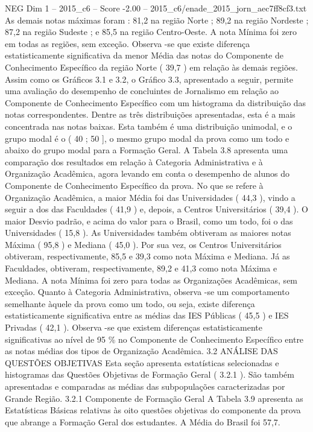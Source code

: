 \begin{textsample}{NEG Dim 1 – 2015\_c6 – Score -2.00 – 2015\_c6/enade\_2015\_jorn\_aec7ff8cf3.txt}
As demais notas máximas foram : 81,2 na região Norte ; 89,2 na região Nordeste ; 87,2 na região Sudeste ; e 85,5 na região Centro-Oeste.
A nota Mínima foi zero em todas as regiões, sem exceção.
Observa -se que existe diferença estatisticamente significativa da menor Média das notas do Componente de Conhecimento Específico da região Norte ( 39,7 ) em relação às demais regiões.
Assim como os Gráficos 3.1 e 3.2, o Gráfico 3.3, apresentado a seguir, permite uma avaliação do desempenho de concluintes de Jornalismo em relação ao Componente de Conhecimento Específico com um histograma da distribuição das notas correspondentes.
Dentre as três distribuições apresentadas, esta é a mais concentrada nas notas baixas.
Esta também é uma distribuição unimodal, e o grupo modal é o ( 40 ; 50 ], o mesmo grupo modal da prova como um todo e abaixo do grupo modal para a Formação Geral.
A Tabela 3.8 apresenta uma comparação dos resultados em relação à Categoria Administrativa e à Organização Acadêmica, agora levando em conta o desempenho de alunos do Componente de Conhecimento Específico da prova.
No que se refere à Organização Acadêmica, a maior Média foi das Universidades ( 44,3 ), vindo a seguir a dos das Faculdades ( 41,9 ) e, depois, a Centros Universitários ( 39,4 ).
O maior Desvio padrão, e acima do valor para o Brasil, como um todo, foi o das Universidades ( 15,8 ).
As Universidades também obtiveram as maiores notas Máxima ( 95,8 ) e Mediana ( 45,0 ).
Por sua vez, os Centros Universitários obtiveram, respectivamente, 85,5 e 39,3 como nota Máxima e Mediana.
Já as Faculdades, obtiveram, respectivamente, 89,2 e 41,3 como nota Máxima e Mediana.
A nota Mínima foi zero para todas as Organizações Acadêmicas, sem exceção.
Quanto à Categoria Administrativa, observa -se um comportamento semelhante àquele da prova como um todo, ou seja, existe diferença estatisticamente significativa entre as médias das IES Públicas ( 45,5 ) e IES Privadas ( 42,1 ).
Observa -se que existem diferenças estatisticamente significativas ao nível de 95 \% no Componente de Conhecimento Específico entre as notas médias dos tipos de Organização Acadêmica. 3.2 ANÁLISE DAS QUESTÕES OBJETIVAS Esta seção apresenta estatísticas selecionadas e histogramas das Questões Objetivas de Formação Geral ( 3.2.1 ).
São também apresentadas e comparadas as médias das subpopulações caracterizadas por Grande Região. 3.2.1 Componente de Formação Geral A Tabela 3.9 apresenta as Estatísticas Básicas relativas às oito questões objetivas do componente da prova que abrange a Formação Geral dos estudantes.
A Média do Brasil foi 57,7.

\end{textsample}

